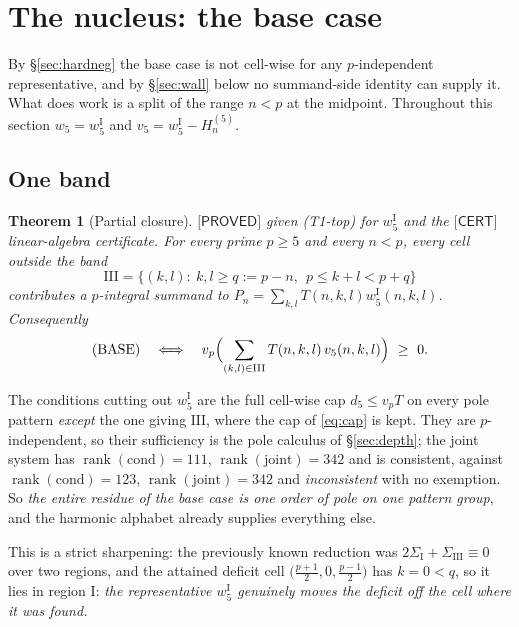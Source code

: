 \documentclass[11pt,reqno]{amsart}
\theoremstyle{plain}
\newtheorem{theorem}{Theorem}[section]
\theoremstyle{definition}
\theoremstyle{remark}
\numberwithin{equation}{section}
\newcommand{\rank}{\operatorname{rank}}
\newcommand{\wfive}{w_5}
\newcommand{\vfive}{v_5}
\newcommand{\PROVED}{\textsf{[PROVED]}}
\newcommand{\CERT}{\textsf{[CERT]}}
\begin{document}
\section{The nucleus: the base case}\label{sec:nucleus}

By \S\ref{sec:hardneg} the base case is not cell-wise for any $p$-independent representative,
and by \S\ref{sec:wall} below no summand-side identity can supply it. What does work is a split
of the range $n<p$ at the midpoint. Throughout this section $\wfive=w_5^{\mathrm I}$ and
$\vfive=w_5^{\mathrm I}-H^{(5)}_n$.

\subsection{One band}

\begin{theorem}[Partial closure]\label{thm:oneband}
$\PROVED$ given \textup{(T1-top)} for $w_5^{\mathrm I}$ and the $\CERT$ linear-algebra
certificate. For every prime $p\ge5$ and every $n<p$, every cell outside the band
\begin{equation}\label{eq:III}
\mathrm{III}=\bigl\{(k,l):\ k,l\ge q:=p-n,\ \ p\le k+l<p+q\bigr\}
\end{equation}
contributes a $p$-integral summand to $P_n=\sum_{k,l}T(n,k,l)w_5^{\mathrm I}(n,k,l)$.
Consequently
\[
\text{\textup{(BASE)}}\quad\Longleftrightarrow\quad
v_p\Bigl(\sum_{(k,l)\in\mathrm{III}}T(n,k,l)\,\vfive(n,k,l)\Bigr)\ \ge\ 0 .
\]
\end{theorem}

The conditions cutting out $w_5^{\mathrm I}$ are the full cell-wise cap $d_5\le v_pT$ on every
pole pattern \emph{except} the one giving $\mathrm{III}$, where the cap of \eqref{eq:cap} is
kept. They are $p$-independent, so their sufficiency is the pole calculus of \S\ref{sec:depth};
the joint system has $\rank(\mathrm{cond})=111$, $\rank(\mathrm{joint})=342$ and is consistent,
against $\rank(\mathrm{cond})=123$, $\rank(\mathrm{joint})=342$ and \emph{inconsistent} with no
exemption. So \emph{the entire residue of the base case is one order of pole on one pattern
group}, and the harmonic alphabet already supplies everything else.

This is a strict sharpening: the previously known reduction was $2\Sigma_{\mathrm I}+\Sigma_{\mathrm{III}}\equiv0$
over two regions, and the attained deficit cell $\bigl(\tfrac{p+1}{2},0,\tfrac{p-1}{2}\bigr)$
has $k=0<q$, so it lies in region $\mathrm I$: \emph{the representative $w_5^{\mathrm I}$
genuinely moves the deficit off the cell where it was found.}
\end{document}
